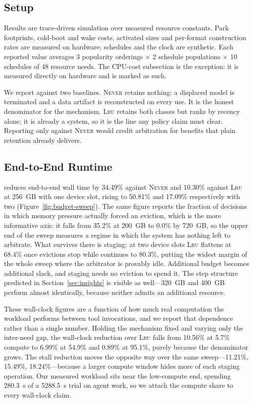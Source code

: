 \subsection{Setup}

Results are trace-driven simulation over measured resource constants. Park
footprints, cold-boot and wake costs, activated sizes and per-format
construction rates are measured on hardware; schedules and the clock are
synthetic. Each reported value averages 3 popularity orderings $\times$ 2
schedule populations $\times$ 10 schedules of 48 resource needs. The CPU-cost
subsection is the exception: it is measured directly on hardware and is marked
as such.

We report against two baselines. \textsc{Never} retains nothing: a displaced
model is terminated and a data artifact is reconstructed on every use. It is
the honest denominator for the mechanism. \textsc{Lru} retains both classes
but ranks by recency alone; it is already a system, so it is the line any
policy claim must clear. Reporting only against \textsc{Never} would credit
arbitration for benefits that plain retention already delivers.

\subsection{End-to-End Runtime}

\sysname{} reduces end-to-end wall time by 34.49\% against \textsc{Never} and
10.30\% against \textsc{Lru} at 256~GB with one device slot, rising to 50.81\%
and 17.09\% respectively with two (Figure~\ref{fig:budget-sweep}). The same
figure reports the fraction of decisions in which memory pressure actually
forced an eviction, which is the more informative axis: it falls from 35.2\%
at 200~GB to 0.0\% by 720~GB, so the upper end of the sweep measures a regime
in which the system has nothing left to arbitrate. What survives there is
staging: at two device slots \textsc{Lru} flattens at 68.4\% once evictions
stop while \sysname{} continues to 80.3\%, putting the widest margin of the
whole sweep where the arbitrator is provably idle. Additional budget becomes
additional slack, and staging needs no eviction to spend it. The step
structure predicted in Section~\ref{sec:insights} is visible as well---320~GB
and 400~GB perform almost identically, because neither admits an additional
resource.

These wall-clock figures are a function of how much real computation the
workload performs between tool invocations, and we report that dependence
rather than a single number. Holding the mechanism fixed and varying only the
inter-need gap, the wall-clock reduction over \textsc{Lru} falls from 10.56\%
at 5.7\% compute to 6.99\% at 54.9\% and 0.89\% at 95.1\%, purely because the
denominator grows. The stall reduction moves the opposite way over the same
sweep---11.21\%, 15.49\%, 18.24\%---because a larger compute window hides more
of each staging operation. Our measured workload sits near the low-compute
end, spending 280.3~s of a 5288.5~s trial on agent work, so we attach the
compute share to every wall-clock claim.

